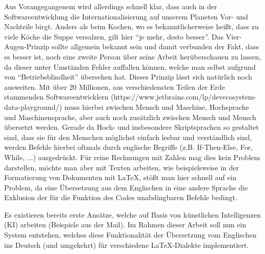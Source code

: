 \documentclass{standalone}
\begin{document}
Aus Vorangegangenem wird allerdings schnell klar, dass auch in der Softwareentwicklung die Internationalisierung auf unserem Planeten Vor- und Nachteile birgt. Anders als beim Kochen, wo es bekanntlicherweise heißt, dass zu viele Köche die Suppe versalzen, gilt hier \enquote{je mehr, desto besser}. Das Vier-Augen-Prinzip sollte allgemein bekannt sein und damit verbunden der Fakt, dass es besser ist, noch eine zweite Person über seine Arbeit herüberschauen zu lassen, da dieser unter Umständen Fehler auffallen können, welche man selbst aufgrund von \enquote{Betriebsblindheit} übersehen hat. 
Dieses Prinzip lässt sich natürlich noch ausweiten. Mit über 20 Millionen, aus verschiedensten Teilen der Erde stammenden Softwareentwicklern (https://www.jetbrains.com/lp/devecosystem-data-playground/) muss hierbei zwischen Mensch und Maschine, Hochsprache und Maschinensprache, aber auch noch zusätzlich zwischen Mensch und Mensch übersetzt werden. 
Gerade da Hoch- und insbesondere Skriptsprachen so gestaltet sind, dass sie für den Menschen möglichst einfach lesbar und verständlich sind, werden Befehle hierbei oftmals durch englische Begriffe (z.B. If-Then-Else, For, While, ...) ausgedrückt. Für reine Rechnungen mit Zahlen mag dies kein Problem darstellen, möchte man aber mit Texten arbeiten, wie beispielsweise in der Formatierung von Dokumenten mit LaTeX, stößt man hier schnell auf ein Problem, da eine Übersetzung aus dem Englischen in eine andere Sprache die Exklusion der für die Funktion des Codes unabdingbaren Befehle bedingt.

Es existieren bereits erste Ansätze, welche auf Basis von künstlichen Intelligenzen (KI) arbeiten (Beispiele aus der Mail). Im Rahmen dieser Arbeit soll nun ein System entstehen, welches diese Funktionalität der Übersetzung vom Englischen ins Deutsch (und umgekehrt) für verschiedene LaTeX-Dialekte implementiert. 

\end{document}
